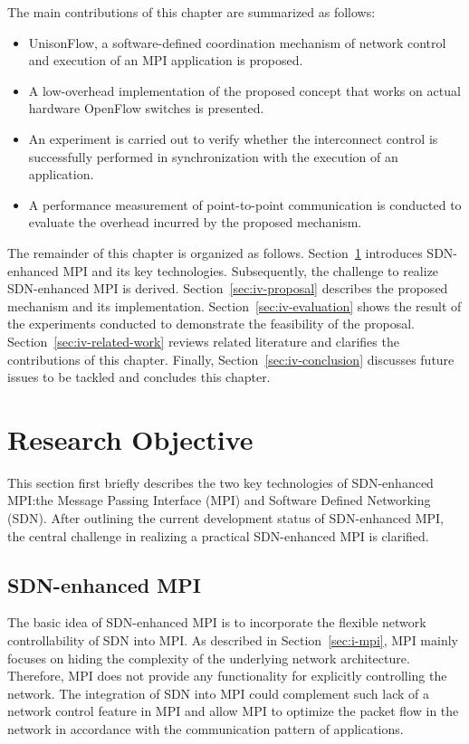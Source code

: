 The main contributions of this chapter are summarized as follows:

\begin{itemize}
\item
  UnisonFlow, a software-defined coordination mechanism of network
  control and execution of an MPI application is proposed.
\item
  A low-overhead implementation of the proposed concept that works on
  actual hardware OpenFlow switches is presented.
\item
  An experiment is carried out to verify whether the interconnect
  control is successfully performed in synchronization with the
  execution of an application.
\item
  A performance measurement of point-to-point communication is conducted
  to evaluate the overhead incurred by the proposed mechanism.
\end{itemize}

The remainder of this chapter is organized as follows.
Section~\ref{sec:iv-objective} introduces SDN-enhanced MPI and its key
technologies. Subsequently, the challenge to realize SDN-enhanced MPI is
derived. Section~\ref{sec:iv-proposal} describes the proposed mechanism and
its implementation. Section~\ref{sec:iv-evaluation} shows the result of the
experiments conducted to demonstrate the feasibility of the proposal.
Section~\ref{sec:iv-related-work} reviews related literature and clarifies the
contributions of this chapter. Finally, Section~\ref{sec:iv-conclusion}
discusses future issues to be tackled and concludes this chapter.

\section{Research Objective}\label{sec:iv-objective}

This section first briefly describes the two key technologies of
SDN-enhanced MPI:\@ the Message Passing Interface (MPI) and Software
Defined Networking (SDN). After outlining the current development status
of SDN-enhanced MPI, the central challenge in realizing a practical
SDN-enhanced MPI is clarified.

\subsection{SDN-enhanced MPI}\label{sec:iv-sdn-mpi}

The basic idea of SDN-enhanced MPI is to incorporate the flexible
network controllability of SDN into MPI\@. As described in
Section~\ref{sec:i-mpi}, MPI mainly focuses on hiding the
complexity of the underlying network architecture. Therefore, MPI does not
provide any functionality for explicitly controlling the network. The
integration of SDN into MPI could complement such lack of a network control
feature in MPI and allow MPI to optimize the packet flow in the network in
accordance with the communication pattern of applications.

